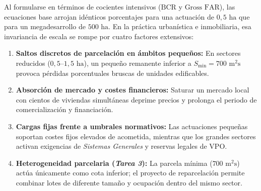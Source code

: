 Al formularse en términos de cocientes intensivos ($\text{BCR}$ y $\text{Gross FAR}$), las ecuaciones base arrojan idénticos porcentajes para una actuación de $0,5\text{ ha}$ que para un megadesarrollo de $500\text{ ha}$. En la práctica urbanística e inmobiliaria, esa invariancia de escala se rompe por cuatro factores extensivos:
\begin{enumerate}
  \item \textbf{Saltos discretos de parcelación en ámbitos pequeños:} En sectores reducidos ($0,5$--$1,5\text{ ha}$), un pequeño remanente inferior a $S_{\mathrm{min}} = 700\text{ m}^2\text{s}$ provoca pérdidas porcentuales bruscas de unidades edificables.
  \item \textbf{Absorción de mercado y costes financieros:} Saturar un mercado local con cientos de viviendas simultáneas deprime precios y prolonga el periodo de comercialización y financiación.
  \item \textbf{Cargas fijas frente a umbrales normativos:} Las actuaciones pequeñas soportan costes fijos elevados de acometida, mientras que los grandes sectores activan exigencias de \emph{Sistemas Generales} y reservas legales de VPO.
  \item \textbf{Heterogeneidad parcelaria (\emph{Tarea 3}):} La parcela mínima ($700\text{ m}^2\text{s}$) actúa únicamente como cota inferior; el proyecto de reparcelación permite combinar lotes de diferente tamaño y ocupación dentro del mismo sector.
\end{enumerate}
